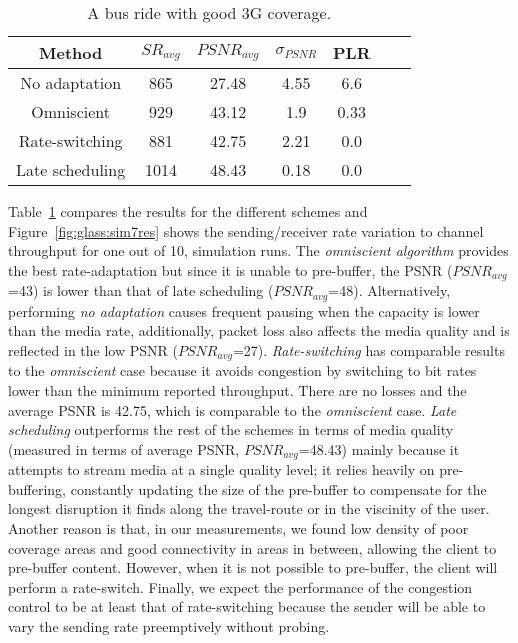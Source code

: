 \begin{table}
  \begin{center}
\begin{tabular}{ccccccc} \hline
Method & $SR_{avg}$ & $PSNR_{avg}$ & $\sigma_{PSNR}$ & PLR \\ \hline
No adaptation   & 865   & 27.48 & 4.55  & 6.6 \\
Omniscient      & 929   & 43.12 & 1.9   & 0.33 \\ 
Rate-switching  & 881   & 42.75 & 2.21  & 0.0  \\ 
Late scheduling & 1014  & 48.43 & 0.18 & 0.0  \\ \hline
\end{tabular}
\caption{A bus ride with good 3G coverage.}
\label{table-glass-sim7res}
\end{center}
\end{table}


Table~\ref{table-glass-sim7res} compares the results for the different schemes
and Figure~\ref{fig:glass:sim7res} shows the sending/receiver rate variation
to channel throughput for one out of 10, simulation runs. The \emph{omniscient
algorithm} provides the best rate-adaptation but since it is unable to 
pre-buffer, the PSNR ($PSNR_{avg}$=43) is lower than that of late scheduling
($PSNR_{avg}$=48). Alternatively, performing \emph{no adaptation} causes
frequent pausing when the capacity is lower than the media rate, additionally,
packet loss also affects the media quality and is reflected in the low PSNR
($PSNR_{avg}$=27). \emph{Rate-switching} has comparable results to the
\emph{omniscient} case because it avoids congestion by switching to bit rates
lower than the minimum reported throughput. There are no losses and the average
PSNR is 42.75, which is comparable to the \emph{omniscient} case. \emph{Late
scheduling} outperforms the rest of the schemes in terms of media quality
(measured in terms of average PSNR, $PSNR_{avg}$=48.43) mainly because it
attempts to stream media at a single quality level; it relies heavily on 
pre-buffering, constantly updating the size of the pre-buffer to compensate for
the longest disruption it finds along the travel-route or in the viscinity of
the user. Another reason is that, in our measurements, we found low density of
poor coverage areas and good connectivity in areas in between, allowing the
client to pre-buffer content. However, when it is not possible to pre-buffer,
the client will perform a rate-switch. Finally, we expect the performance of
the congestion control to be at least that of rate-switching because the
sender will be able to vary the sending rate preemptively without probing.

